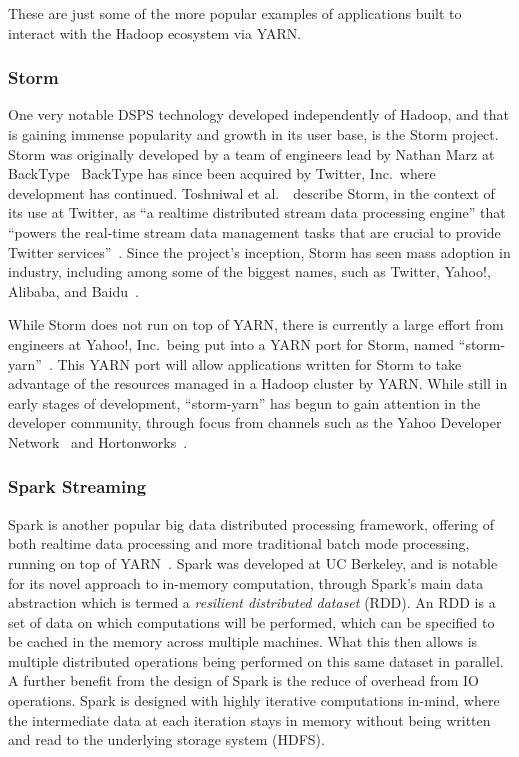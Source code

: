\documentclass[a4paper,11pt]{article}
\begin{document}
These are just some of the more popular examples of applications built to interact with the Hadoop ecosystem via YARN.



\subsubsection{Storm} %
\label{ssub:storm}

One very notable DSPS technology developed independently of Hadoop, and that is gaining immense popularity and growth in its
user base, is the Storm project. Storm was originally developed by a team of engineers lead by Nathan Marz at
BackType~\cite{web_storm} BackType has since been acquired by Twitter, Inc.\ where development has
continued. Toshniwal et al.~\cite{toshniwal2014storm}\ describe Storm, in the context of its use at Twitter, as ``a
realtime distributed stream data processing engine'' that ``powers the real-time stream data management tasks that are
crucial to provide Twitter services''~\cite[p.\ 147]{toshniwal2014storm}. Since the project's inception, Storm has seen mass
adoption in industry, including among some of the biggest names, such as Twitter, Yahoo!, Alibaba, and
Baidu~\cite{storm_users}.

While Storm does not run on top of YARN, there is currently a large effort from engineers at Yahoo!, Inc.\ being put
into a YARN port for Storm, named ``storm-yarn''~\cite{web_storm_yarn}. This YARN port will
allow applications written for Storm to take advantage of the resources managed in a Hadoop cluster by YARN. While still
in early stages of development, ``storm-yarn'' has begun to gain attention in the developer community, through focus from
channels such as the Yahoo Developer Network~\cite{web_yahoo_blog} and Hortonworks~\cite{web_hortonworks_blog}.



\subsubsection{Spark Streaming} %
\label{ssub:spark_streaming}

Spark is another popular big data distributed processing framework, offering of both realtime data processing
and more traditional batch mode processing, running on top of YARN~\cite{zaharia2010spark}. Spark was developed at UC
Berkeley, and is notable for its novel approach to in-memory computation, through Spark's main data abstraction which is
termed a \emph{resilient distributed dataset} (RDD). An RDD is a set of data on which computations will be performed,
which can be specified to be cached in the memory across multiple machines. What this then allows is multiple distributed
operations being performed on this same dataset in parallel. A further benefit from the design of Spark is the reduce of
overhead from IO operations. Spark is designed with highly iterative computations in-mind, where the intermediate data
at each iteration stays in memory without being written and read to the underlying storage system (\eg{}HDFS).
\end{document}
